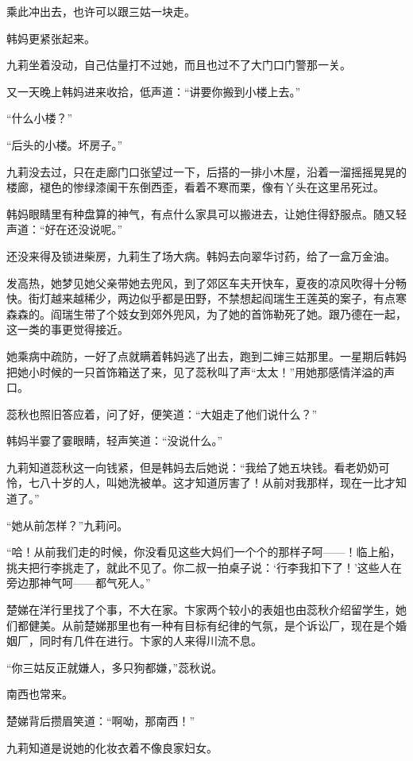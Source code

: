 \par 乘此冲出去，也许可以跟三姑一块走。
\par 韩妈更紧张起来。
\par 九莉坐着没动，自己估量打不过她，而且也过不了大门口门警那一关。
\par 又一天晚上韩妈进来收拾，低声道：“讲要你搬到小楼上去。”
\par “什么小楼？”
\par “后头的小楼。坏房子。”
\par 九莉没去过，只在走廊门口张望过一下，后搭的一排小木屋，沿着一溜摇摇晃晃的楼廊，褪色的惨绿漆阑干东倒西歪，看着不寒而栗，像有丫头在这里吊死过。
\par 韩妈眼睛里有种盘算的神气，有点什么家具可以搬进去，让她住得舒服点。随又轻声道：“好在还没说呢。”
\par 还没来得及锁进柴房，九莉生了场大病。韩妈去向翠华讨药，给了一盒万金油。
\par 发高热，她梦见她父亲带她去兜风，到了郊区车夫开快车，夏夜的凉风吹得十分畅快。街灯越来越稀少，两边似乎都是田野，不禁想起阎瑞生王莲英的案子，有点寒森森的。阎瑞生带了个妓女到郊外兜风，为了她的首饰勒死了她。跟乃德在一起，这一类的事更觉得接近。
\par 她乘病中疏防，一好了点就瞒着韩妈逃了出去，跑到二婶三姑那里。一星期后韩妈把她小时候的一只首饰箱送了来，见了蕊秋叫了声“太太！”用她那感情洋溢的声口。
\par 蕊秋也照旧答应着，问了好，便笑道：“大姐走了他们说什么？”
\par 韩妈半霎了霎眼睛，轻声笑道：“没说什么。”
\par 九莉知道蕊秋这一向钱紧，但是韩妈去后她说：“我给了她五块钱。看老奶奶可怜，七八十岁的人，叫她洗被单。这才知道厉害了！从前对我那样，现在一比才知道了。”
\par “她从前怎样？”九莉问。
\par “哈！从前我们走的时候，你没看见这些大妈们一个个的那样子呵——！临上船，挑夫把行李挑走了，就此不见了。你二叔一拍桌子说：‘行李我扣下了！’这些人在旁边那神气呵——都气死人。”
\par 楚娣在洋行里找了个事，不大在家。卞家两个较小的表姐也由蕊秋介绍留学生，她们都健美。从前楚娣那里也有一种有目标有纪律的气氛，是个诉讼厂，现在是个婚姻厂，同时有几件在进行。卞家的人来得川流不息。
\par “你三姑反正就嫌人，多只狗都嫌，”蕊秋说。
\par 南西也常来。
\par 楚娣背后攒眉笑道：“啊呦，那南西！”
\par 九莉知道是说她的化妆衣着不像良家妇女。
